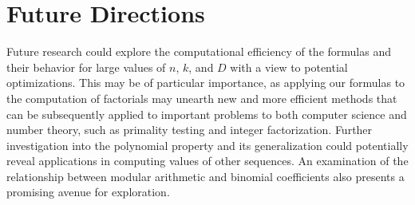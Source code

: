 \documentclass{article}
\theoremstyle{plain}
\begin{document}
\section{Future Directions}
Future research could explore the computational efficiency of the formulas and their behavior for large values of \(n\), \(k\), and \(D\) with a view to potential optimizations. This may be of particular importance, as applying our formulas to the computation of factorials may unearth new and more efficient methods that can be subsequently applied to important problems to both computer science and number theory, such as primality testing and integer factorization. Further investigation into the polynomial property and its generalization could potentially reveal applications in computing values of other sequences. An examination of the relationship between modular arithmetic and binomial coefficients also presents a promising avenue for exploration.



\end{document}
